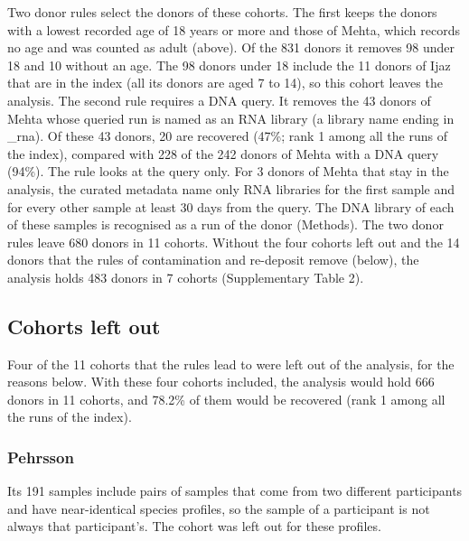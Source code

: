 \documentclass[11pt,a4paper]{article}
\begin{document}
Two donor rules select the donors of these cohorts. The first keeps the donors with a lowest recorded age of 18 years or more and those of Mehta, which records no age and was counted as adult (above). Of the 831 donors it removes 98 under 18 and 10 without an age. The 98 donors under 18 include the 11 donors of Ijaz that are in the index (all its donors are aged 7 to 14), so this cohort leaves the analysis. The second rule requires a DNA query. It removes the 43 donors of Mehta whose queried run is named as an RNA library (a library name ending in \_rna). Of these 43 donors, 20 are recovered (47\%; rank 1 among all the runs of the index), compared with 228 of the 242 donors of Mehta with a DNA query (94\%). The rule looks at the query only. For 3 donors of Mehta that stay in the analysis, the curated metadata name only RNA libraries for the first sample and for every other sample at least 30 days from the query. The DNA library of each of these samples is recognised as a run of the donor (Methods). The two donor rules leave 680 donors in 11 cohorts. Without the four cohorts left out and the 14 donors that the rules of contamination and re-deposit remove (below), the analysis holds 483 donors in 7 cohorts (Supplementary Table 2).

\subsection*{Cohorts left out}

Four of the 11 cohorts that the rules lead to were left out of the analysis, for the reasons below. With these four cohorts included, the analysis would hold 666 donors in 11 cohorts, and 78.2\% of them would be recovered (rank 1 among all the runs of the index).

\subsubsection*{Pehrsson}

Its 191 samples include pairs of samples that come from two different participants and have near-identical species profiles, so the sample of a participant is not always that participant's. The cohort was left out for these profiles.
\end{document}

